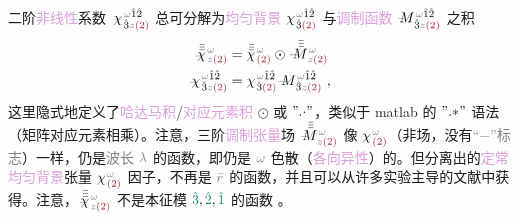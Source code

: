二阶\textcolor{Plum}{非线性}系数 $\xint{{}^{}_{\mathcolor{gray}{-}}}{23}{\chi}^{\;\! \mathcolor{gray}{\omega} \hat{1} \hat{2} }_{\;\! \hat{3} \mathcolor{gray}{z} \textcolor{Maroon}{(2)} }$ 总可分解为\textcolor{Plum}{均匀背景} ${\chi}^{\;\! \mathcolor{gray}{\omega} \hat{1} \hat{2} }_{\;\! \hat{3} \textcolor{Maroon}{(2)} }$ 与\textcolor{Plum}{调制函数} $\xint{\mathcolor{gray}{-}}{18}{M}^{\;\! \mathcolor{gray}{\omega} \hat{1} \hat{2} }_{\;\! \hat{3} \mathcolor{gray}{z} \textcolor{Maroon}{(2)} }$ 之积
\begin{subequations} \label{eq:chi2-modulate}
\begin{align}
	\xint{{}^{}_{\mathcolor{gray}{-}}}{23}{\bar{\bar{\bar{\chi}}}}^{\;\! \mathcolor{gray}{\omega} }_{\;\! \mathcolor{gray}{z} \textcolor{Maroon}{(2)} } &= \bar{\bar{\bar{\chi}}}^{\;\! \mathcolor{gray}{\omega} }_{\;\! \textcolor{Maroon}{(2)} } \odot \xint{\mathcolor{gray}{-}}{18}{\bar{\bar{\bar{M}}}}^{\;\! \mathcolor{gray}{\omega} }_{\;\! \mathcolor{gray}{z} \textcolor{Maroon}{(2)} } \label{eq:vec-chi2-modulate} \\
	\xint{{}^{}_{\mathcolor{gray}{-}}}{23}{\chi}^{\;\! \mathcolor{gray}{\omega} \hat{1} \hat{2} }_{\;\! \hat{3} \mathcolor{gray}{z} \textcolor{Maroon}{(2)} } &= {\chi}^{\;\! \mathcolor{gray}{\omega} \hat{1} \hat{2} }_{\;\! \hat{3} \textcolor{Maroon}{(2)} } \xint{\mathcolor{gray}{-}}{18}{M}^{\;\! \mathcolor{gray}{\omega} \hat{1} \hat{2} }_{\;\! \hat{3} \mathcolor{gray}{z} \textcolor{Maroon}{(2)} } ~, \label{eq:components-chi2-modulate}
\end{align}
\end{subequations}
这里隐式地定义了\textcolor{Plum}{哈达马积}/\textcolor{Plum}{对应元素积} $\odot$ 或 $"{.\cdot}"$，类似于 matlab 的 $"{.*}"$ 语法（矩阵对应元素相乘）。注意，三阶\textcolor{Plum}{调制张量}\textcolor{NavyBlue}{场} $\xint{\mathcolor{gray}{-}}{18}{\bar{\bar{\bar{M}}}}^{\;\! \mathcolor{gray}{\omega} }_{\;\! \mathcolor{gray}{z} \textcolor{Maroon}{(2)} }$ 像 ${\chi}^{\;\! \mathcolor{gray}{\omega} }_{\;\! \textcolor{Maroon}{(2)} }$（\textcolor{NavyBlue}{非场}，没有\textcolor{gray}{“$-$”标志}）一样，仍是\textcolor{gray}{波长} $\mathcolor{gray}{\lambda}$ 的函数，即仍是 $\mathcolor{gray}{\omega}$ \textcolor{NavyBlue}{色散}（\textcolor{Plum}{各向异性}）的。但分离出的\textcolor{Plum}{定常}\textcolor{Plum}{均匀背景}张量 ${\chi}^{\;\! \mathcolor{gray}{\omega} }_{\;\! \textcolor{Maroon}{(2)} }$ 因子，不再是 $\mathcolor{gray}{\bar{r}}$ 的函数，并且可以从许多\textcolor{NavyBlue}{实验主导}的文献中获得\cite{nyePhysicalPropertiesCrystals2012,zuOpticalSecondHarmonic2024,zuAnalyticalNumericalModeling2022,gananyQuasiphaseMatchingLiNbO32006,segondsLinearNonlinearOptical2004,dolevLinearNonlinearOptical2009,kaschkeCalculationNonlinearOptical1989,itoGeneralizedStudyAngular1975}。注意，$\xint{{}^{}_{\mathcolor{gray}{-}}}{23}{\bar{\bar{\bar{\chi}}}}^{\;\! \mathcolor{gray}{\omega} }_{\;\! \mathcolor{gray}{z} \textcolor{Maroon}{(2)} }$ 不是\textcolor{PineGreen}{本征模} $\textcolor{PineGreen}{\hat{3}},\textcolor{PineGreen}{\hat{2}},\textcolor{PineGreen}{\hat{1}}$ 的函数 。


